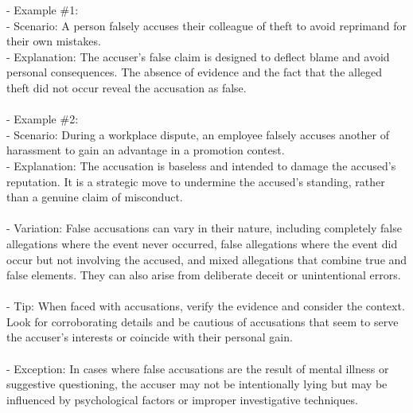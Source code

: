 \documentclass[a4paper,12pt,single,pdftex]{scrbook}
\begin{document}
    
      - Example \#1:
    \\

    
        - Scenario: A person falsely accuses their colleague of theft to avoid reprimand for their own mistakes.
    \\

    
        - Explanation: The accuser's false claim is designed to deflect blame and avoid personal consequences. The absence of evidence and the fact that the alleged theft did not occur reveal the accusation as false.
    \\

    
      
    \\

    
      - Example \#2:
    \\

    
        - Scenario: During a workplace dispute, an employee falsely accuses another of harassment to gain an advantage in a promotion contest.
    \\

    
        - Explanation: The accusation is baseless and intended to damage the accused's reputation. It is a strategic move to undermine the accused's standing, rather than a genuine claim of misconduct.
    \\

    
      
    \\

    
      - Variation: False accusations can vary in their nature, including completely false allegations where the event never occurred, false allegations where the event did occur but not involving the accused, and mixed allegations that combine true and false elements. They can also arise from deliberate deceit or unintentional errors.
    \\

    
      
    \\

    
      - Tip: When faced with accusations, verify the evidence and consider the context. Look for corroborating details and be cautious of accusations that seem to serve the accuser's interests or coincide with their personal gain.
    \\

    
      
    \\

    
      - Exception: In cases where false accusations are the result of mental illness or suggestive questioning, the accuser may not be intentionally lying but may be influenced by psychological factors or improper investigative techniques.
    \\
\end{document}
